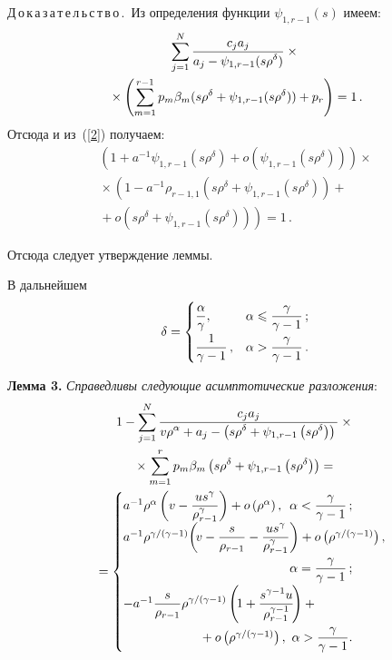 \begin{multicols}{2}
\noindent
Д\,о\,к\,а\,з\,а\,т\,е\,л\,ь\,с\,т\,в\,о\,.\
Из определения функции $\psi_{1,r-1}(s)$ имеем:
\begin{multline*}
\sum\limits_{j=1}^N\displaystyle\frac{\displaystyle c_ja_j\mathstrut}{\displaystyle a_j-\psi_{1,r-1}(s\rho^{\delta})\mathstrut}\times{}\\
{}\times
\left(\sum\limits_{m=1}^{r-1}p_m\beta_m(s\rho^{\delta}+\psi_{1,r-1}(s\rho^{\delta}))+
p_r\right)=1\,.
\end{multline*}
Отсюда и из~(\ref{2}) получаем:
\begin{multline*}
\left(1+a^{-1}\psi_{1,r-1}\left(s\rho^{\delta}\right)+
o\left(\psi_{1,r-1}\left(s\rho^{\delta}\right)\right)\right)\times{}\\
{}\times\left(1-a^{-1}\rho_{r-1,1}\left(s\rho^{\delta}+\psi_{1,r-1}\left(s\rho^{\delta}\right)\right)
+{}\right.\\
\left.{}+o\left(s\rho^{\delta}+\psi_{1,r-1}\left(s\rho^{\delta}\right)\right)\right)=1\,.
\end{multline*}

Отсюда следует утверждение леммы.

В дальнейшем
$$
\delta=\begin{cases}
\displaystyle\frac{\displaystyle \alpha\mathstrut}{\displaystyle \gamma\mathstrut},&\alpha\leqslant \displaystyle\frac{\displaystyle \gamma\mathstrut}{\displaystyle \gamma-1\mathstrut}\,;\\[6pt]
\displaystyle\frac{\displaystyle 1\mathstrut}{\displaystyle \gamma-1\mathstrut}\,,&\alpha> \displaystyle\frac{\displaystyle \gamma\mathstrut}{\displaystyle \gamma-1\mathstrut}\,.
\end{cases}
$$

\noindent
\textbf{Лемма 3.} \textit{Справедливы следующие асимптотические разложения}:
\begin{multline*}
1-\sum\limits_{j=1}^N\fr{c_ja_j}{v\rho^{\alpha}+
a_j-\left(s\rho^{\delta}+\psi_{1,r-1}\left(s\rho^{\delta}\right)\right)}\times{}\\
{}\times
\sum\limits_{m=1}^rp_m\beta_m\left(s\rho^{\delta}+\psi_{1,r-1}\left(s\rho^{\delta}\right)\right)={}\\
{}=\begin{cases}
a^{-1}\rho^{\alpha}\left(v-\fr{us^{\gamma}}{\rho_{r-1}^{\gamma}}\right)+
o\left(\rho^{\alpha}\right),&\hspace*{-30mm}\alpha<\fr{\gamma}{\gamma-1}\,;\\[6pt]
a^{-1}\rho^{{\gamma}/({\gamma-1})}\!\left(\!v-\fr{s}{\rho_{r-1}}-
\fr{us^{\gamma}}{\rho_{r-1}^{\gamma}}\right)+
o\left(\rho^{{\gamma}/({\gamma-1})}\right),&\hspace*{-18.81908pt}\\[6pt]
&\hspace*{-30mm}\alpha=\fr{\gamma}{\gamma-1}\,;\\[6pt]
-a^{-1}\fr{s}{\rho_{r-1}}\rho^{{\gamma}/({\gamma-1})}\left(\!1+
\fr{s^{\gamma-1}u}{\rho_{r-1}^{\gamma-1}}\!\right)+{}\\
&\hspace*{-55mm}{}+o\left(\rho^{{\gamma}/({\gamma-1})}\right),\ \alpha>\fr{\gamma}{\gamma-1}.
\end{cases}
\end{multline*}



\end{multicols}
